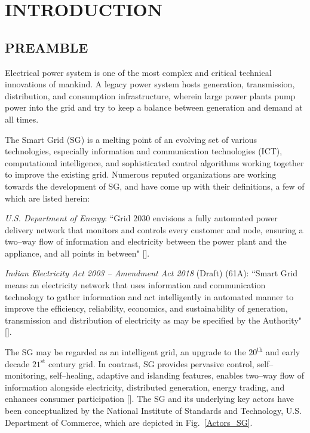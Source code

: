 \chapter{INTRODUCTION}
\section{PREAMBLE}
Electrical power system is one of the most complex and critical technical innovations of mankind. A legacy power system hosts generation, transmission, distribution, and consumption infrastructure, wherein large power plants pump power into the grid and try to keep a balance between generation and demand at all times.

The Smart Grid (SG) is a melting point of an evolving set of various technologies, especially information and communication technologies (ICT), computational intelligence, and sophisticated control algorithms working together to improve the existing grid. Numerous reputed organizations are working towards the development of SG, and have come up with their definitions, a few of which are listed herein:

\noindent \textit{U.S. Department of Energy}: ``Grid 2030 envisions a fully automated power delivery network that monitors and controls every customer and node, ensuring a two--way flow of information and electricity between the power plant and the appliance, and all points in between" [\cite{borlase2016}].

\noindent \textit{Indian Electricity Act 2003 -- Amendment Act 2018} (Draft) (61A): ``Smart Grid means an electricity network that uses information and communication technology to gather information and act intelligently in automated manner to improve the efficiency, reliability, economics, and sustainability of generation, transmission and distribution of electricity as may be specified by the Authority" [\cite{MoP2018}].

The SG may be regarded as an intelligent grid, an upgrade to the $20^\textrm{th}$ and early decade $21^\textrm{st}$ century grid. In contrast, SG provides pervasive control, self--monitoring, self--healing, adaptive and islanding features, enables two--way flow of information alongside electricity, distributed generation, energy trading, and enhances consumer participation [\cite{fang2012}]. The SG and its underlying key actors have been conceptualized by the National Institute of Standards and Technology, U.S. Department of Commerce, which are depicted in Fig.~\ref{Actors_SG}.

